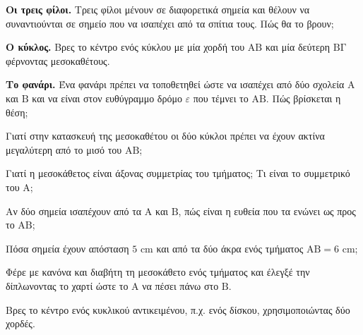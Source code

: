 \ex \textbf{Οι τρεις φίλοι.} Τρεις φίλοι μένουν σε διαφορετικά σημεία και θέλουν να συναντιούνται σε σημείο που να ισαπέχει από τα σπίτια τους. Πώς θα το βρουν;

\ex \textbf{Ο κύκλος.} Βρες το κέντρο ενός κύκλου με μία χορδή του $\mathrm{ΑΒ}$ και μία δεύτερη $\mathrm{ΒΓ}$ φέρνοντας μεσοκαθέτους.

\ex \textbf{Το φανάρι.} Ένα φανάρι πρέπει να τοποθετηθεί ώστε να ισαπέχει από δύο σχολεία $\mathrm{Α}$ και $\mathrm{Β}$ και να είναι στον ευθύγραμμο δρόμο $\varepsilon$ που τέμνει το $\mathrm{ΑΒ}$. Πώς βρίσκεται η θέση;


\ex Γιατί στην κατασκευή της μεσοκαθέτου οι δύο κύκλοι πρέπει να έχουν ακτίνα μεγαλύτερη από το μισό του $\mathrm{ΑΒ}$;

\ex Γιατί η μεσοκάθετος είναι άξονας συμμετρίας του τμήματος; Τι είναι το συμμετρικό του $\mathrm{Α}$;

\ex Αν δύο σημεία ισαπέχουν από τα $\mathrm{Α}$ και $\mathrm{Β}$, πώς είναι η ευθεία που τα ενώνει ως προς το $\mathrm{ΑΒ}$;

\ex Πόσα σημεία έχουν απόσταση $5$ cm και από τα δύο άκρα ενός τμήματος $\mathrm{ΑΒ}=6$ cm;


\ex Φέρε με κανόνα και διαβήτη τη μεσοκάθετο ενός τμήματος και έλεγξέ την δίπλωνοντας το χαρτί ώστε το $\mathrm{Α}$ να πέσει πάνω στο $\mathrm{Β}$.

\ex Βρες το κέντρο ενός κυκλικού αντικειμένου, π.χ. ενός δίσκου, χρησιμοποιώντας δύο χορδές.
